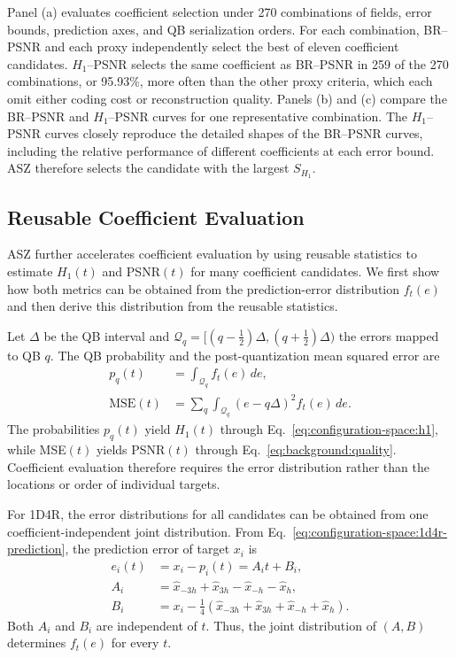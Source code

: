 Panel (a) evaluates coefficient selection under 270 combinations of fields, error bounds, prediction axes, and QB serialization orders. For each combination, BR--PSNR and each proxy independently select the best of eleven coefficient candidates. $H_1$--PSNR selects the same coefficient as BR--PSNR in 259 of the 270 combinations, or 95.93\%, more often than the other proxy criteria, which each omit either coding cost or reconstruction quality. Panels (b) and (c) compare the BR--PSNR and $H_1$--PSNR curves for one representative combination. The $H_1$--PSNR curves closely reproduce the detailed shapes of the BR--PSNR curves, including the relative performance of different coefficients at each error bound. ASZ therefore selects the candidate with the largest $S_{H_1}$.

\subsection{Reusable Coefficient Evaluation}
\label{sec:configuration-space:coefficient-evaluation}

ASZ further accelerates coefficient evaluation by using reusable statistics to estimate $H_1(t)$ and PSNR$(t)$ for many coefficient candidates. We first show how both metrics can be obtained from the prediction-error distribution $f_t(e)$ and then derive this distribution from the reusable statistics.

Let $\Delta$ be the QB interval and $\mathcal{Q}_q=[(q-\tfrac12)\Delta,(q+\tfrac12)\Delta)$ the errors mapped to QB $q$. The QB probability and the post-quantization mean squared error are
\begin{equation}
\label{eq:configuration-space:distribution-metrics}
\begin{aligned}
p_q(t)&=\int_{\mathcal{Q}_q}f_t(e)\,de,\\
\mathrm{MSE}(t)&=\sum_q\int_{\mathcal{Q}_q}(e-q\Delta)^2f_t(e)\,de.
\end{aligned}
\end{equation}
The probabilities $p_q(t)$ yield $H_1(t)$ through Eq.~\eqref{eq:configuration-space:h1}, while MSE$(t)$ yields PSNR$(t)$ through Eq.~\eqref{eq:background:quality}. Coefficient evaluation therefore requires the error distribution rather than the locations or order of individual targets.

For 1D4R, the error distributions for all candidates can be obtained from one coefficient-independent joint distribution. From Eq.~\eqref{eq:configuration-space:1d4r-prediction}, the prediction error of target $x_i$ is
\begin{equation}
\label{eq:configuration-space:affine-error}
\begin{aligned}
e_i(t)&=x_i-p_i(t)=A_it+B_i,\\
A_i&=\hat x_{-3h}+\hat x_{3h}-\hat x_{-h}-\hat x_h,\\
B_i&=x_i-\tfrac14(\hat x_{-3h}+\hat x_{3h}+\hat x_{-h}+\hat x_h).
\end{aligned}
\end{equation}
Both $A_i$ and $B_i$ are independent of $t$. Thus, the joint distribution of $(A,B)$ determines $f_t(e)$ for every $t$.

